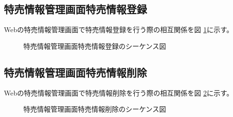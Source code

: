 \documentclass[a4j]{jarticle}
\begin{document}
\subsection{特売情報管理画面特売情報登録}
Webの特売情報管理画面で特売情報登録を行う際の相互関係を図 \ref {tab:oonishi21}に示す。
\begin{figure}[H]
\begin{center}
\caption{特売情報管理画面特売情報登録のシーケンス図}
\label{tab:oonishi21}
\end{center}
\end{figure}
\subsection{特売情報管理画面特売情報削除}
Webの特売情報管理画面で特売情報削除を行う際の相互関係を図 \ref {tab:oonishi22}に示す。
\begin{figure}[H]
\begin{center}
\caption{特売情報管理画面特売情報削除のシーケンス図}
\label{tab:oonishi22}
\end{center}
\end{figure}
\end{document}
